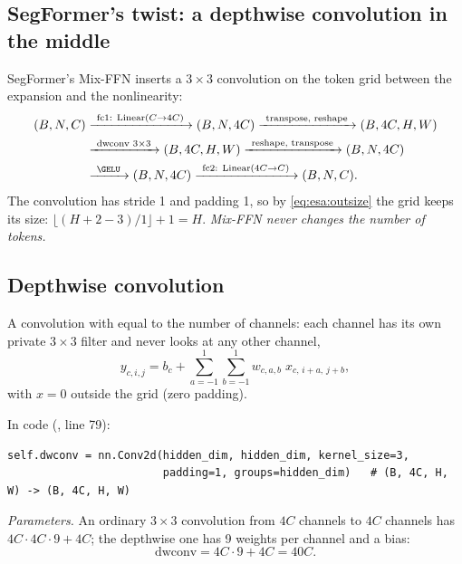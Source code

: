 \subsection{SegFormer's twist: a depthwise convolution in the middle}

SegFormer's Mix-FFN \citep{xie2021segformer} inserts a $3\times3$ convolution on the
token grid between the expansion and the nonlinearity:
\begin{align*}
  (B, N, C) &\xrightarrow{\ \text{fc1: Linear}(C\to4C)\ } (B, N, 4C)
  \xrightarrow{\ \text{transpose, reshape}\ } (B, 4C, H, W)\\
  &\xrightarrow{\ \text{dwconv } 3\times3\ } (B, 4C, H, W)
  \xrightarrow{\ \text{reshape, transpose}\ } (B, N, 4C)\\
  &\xrightarrow{\ \GELU\ } (B, N, 4C)
  \xrightarrow{\ \text{fc2: Linear}(4C\to C)\ } (B, N, C).
\end{align*}
The convolution has stride 1 and padding 1, so by \cref{eq:esa:outsize} the grid keeps its size:
$\lfloor(H + 2 - 3)/1\rfloor + 1 = H$. \emph{Mix-FFN never changes the number of tokens.}


\subsection{Depthwise convolution}

\begin{definition}
A convolution with  equal to the number of channels: each channel has its own private
$3\times3$ filter and never looks at any other channel,
\begin{equation}\label{eq:block:dw}
  y_{c,i,j} = b_c + \sum_{a=-1}^{1}\sum_{b=-1}^{1} w_{c,a,b}\; x_{c,\,i+a,\,j+b},
\end{equation}
with $x = 0$ outside the grid (zero padding).
\end{definition}
In code (, line 79):
\begin{lstlisting}
self.dwconv = nn.Conv2d(hidden_dim, hidden_dim, kernel_size=3,
                        padding=1, groups=hidden_dim)   # (B, 4C, H, W) -> (B, 4C, H, W)
\end{lstlisting}
\emph{Parameters.} An ordinary $3\times3$ convolution from $4C$ channels to $4C$ channels has
$4C\cdot4C\cdot9 + 4C$; the depthwise one has 9 weights per channel and a bias:
\begin{equation}\label{eq:block:dwparams}
  \text{dwconv} = 4C\cdot9 + 4C = 40C .
\end{equation}

